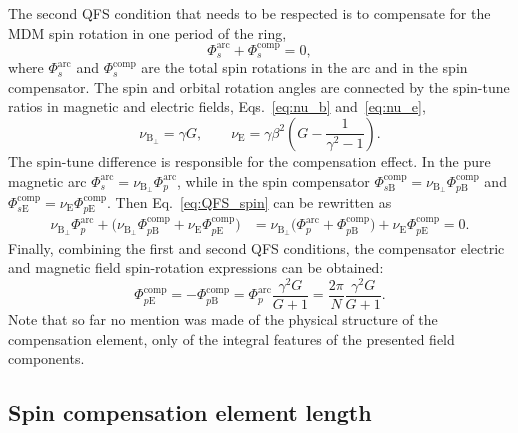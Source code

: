\documentclass[%
  aps,
  pra,
  preprint,
  a4paper,
  amsmath,
  amssymb,
  floatfix,
  longbibliography,
  superscriptaddress
]{revtex4-2}
\begin{document}
The second QFS condition that needs to be respected is to compensate for the MDM
spin rotation in one period of the ring,
\begin{equation}
  \Phi_s^{\mathrm{arc}}+\Phi_{s}^{\mathrm{comp}}=0,
  \label{eq:QFS_spin}
\end{equation}
where $\Phi_s^{\mathrm{arc}}$ and $\Phi_{s}^{\mathrm{comp}}$ are the total spin
rotations in the arc and in the spin compensator. The spin and orbital rotation
angles are connected by the spin-tune ratios in magnetic and electric fields,
Eqs.~\eqref{eq:nu_b} and~\eqref{eq:nu_e},
\begin{equation}
  \nu_{\mathrm{B}_{\perp}} = \gamma G, \qquad
  \nu_{\mathrm{E}} = \gamma \beta^2 \left(G-\frac{1}{\gamma^{2}-1}\right).
  \label{eq:spin-tune}
\end{equation}
The spin-tune difference is responsible for the compensation effect. In the
pure magnetic arc $\Phi_{s}^{\mathrm{arc}} =
\nu_{\mathrm{B}_{\perp}}\Phi_{p}^{\mathrm{arc}}$, while in the spin compensator
$\Phi_{s\mathrm{B}}^{\mathrm{comp}} =
\nu_{\mathrm{B}_{\perp}}\Phi_{p\mathrm{B}}^{\mathrm{comp}}$ and
$\Phi_{s\mathrm{E}}^{\mathrm{comp}} =
\nu_{\mathrm{E}}\Phi_{p\mathrm{E}}^{\mathrm{comp}}$. Then
Eq.~\eqref{eq:QFS_spin} can be rewritten as
\begin{equation}
\begin{aligned}
  \nu_{\mathrm{B}_{\perp}}\Phi_{p}^{\mathrm{arc}} +
  \bigl(\nu_{\mathrm{B}_{\perp}}\Phi_{p\mathrm{B}}^{\mathrm{comp}} +
  \nu_{\mathrm{E}}\Phi_{p\mathrm{E}}^{\mathrm{comp}} \bigr)
  &=
  \nu_{\mathrm{B}_{\perp}} \bigl(
  \Phi_{p}^{\mathrm{arc}} +
  \Phi_{p\mathrm{B}}^{\mathrm{comp}} \bigr) +
  \nu_{\mathrm{E}}\Phi_{p\mathrm{E}}^{\mathrm{comp}}  = 0.
\end{aligned}
\label{eq:deflection_sum}
\end{equation}
Finally, combining the first and second QFS conditions, the compensator
electric and magnetic field spin-rotation expressions can be obtained:
\begin{equation}
  \Phi_{p\mathrm{E}}^{\mathrm{comp}} = - \Phi_{p\mathrm{B}}^{\mathrm{comp}}
  = {\Phi}_{p}^{\mathrm{arc}}\frac{\gamma^2 G}{G+1}
  =\frac{2\pi}{N}\frac{\gamma^2 G}{G+1}.
  \label{eq:deflection}
\end{equation}
Note that so far no mention was made of the physical structure of the
compensation element, only of the integral features of the presented field
components.

\subsection{Spin compensation element length}
\end{document}
